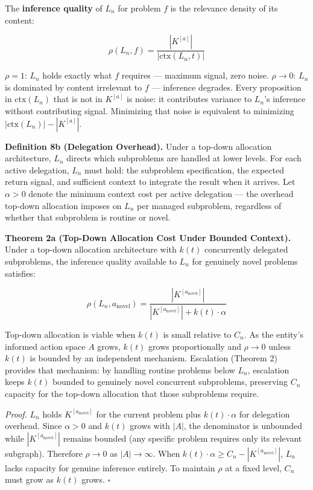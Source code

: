 \documentclass[
]{article}
\begin{document}
The \textbf{inference quality} of \(L_n\) for problem \(f\) is the
relevance density of its content:

\[\rho(L_n, f) = \frac{|K^{[a]}|}{|\text{ctx}(L_n, t)|}\]

\(\rho = 1\): \(L_n\) holds exactly what \(f\) requires --- maximum
signal, zero noise. \(\rho \to 0\): \(L_n\) is dominated by content
irrelevant to \(f\) --- inference degrades. Every proposition in
\(\text{ctx}(L_n)\) that is not in \(K^{[a]}\) is noise: it contributes
variance to \(L_n\)'s inference without contributing signal. Minimizing
that noise is equivalent to minimizing
\(|\text{ctx}(L_n)| - |K^{[a]}|\).

\textbf{Definition 8b (Delegation Overhead).} Under a top-down
allocation architecture, \(L_n\) directs which subproblems are handled
at lower levels. For each active delegation, \(L_n\) must hold: the
subproblem specification, the expected return signal, and sufficient
context to integrate the result when it arrives. Let \(\alpha > 0\)
denote the minimum context cost per active delegation --- the overhead
top-down allocation imposes on \(L_n\) per managed subproblem,
regardless of whether that subproblem is routine or novel.

\textbf{Theorem 2a (Top-Down Allocation Cost Under Bounded Context).}
Under a top-down allocation architecture with \(k(t)\) concurrently
delegated subproblems, the inference quality available to \(L_n\) for
genuinely novel problems satisfies:

\[\rho(L_n, a_{\text{novel}}) = \frac{|K^{[a_{\text{novel}}]}|}{|K^{[a_{\text{novel}}]}| + k(t)\cdot\alpha}\]

Top-down allocation is viable when \(k(t)\) is small relative to
\(C_n\). As the entity's informed action space \(A\) grows, \(k(t)\)
grows proportionally and \(\rho \to 0\) unless \(k(t)\) is bounded by
an independent mechanism. Escalation (Theorem 2) provides that
mechanism: by handling routine problems below \(L_n\), escalation keeps
\(k(t)\) bounded to genuinely novel concurrent subproblems, preserving
\(C_n\) capacity for the top-down allocation that those subproblems
require.

\emph{Proof.} \(L_n\) holds \(K^{[a_{\text{novel}}]}\) for the current
problem plus \(k(t)\cdot\alpha\) for delegation overhead. Since
\(\alpha > 0\) and \(k(t)\) grows with \(|A|\), the denominator is
unbounded while \(|K^{[a_{\text{novel}}]}|\) remains bounded (any
specific problem requires only its relevant subgraph). Therefore
\(\rho \to 0\) as \(|A| \to \infty\). When
\(k(t)\cdot\alpha \geq C_n - |K^{[a_{\text{novel}}]}|\), \(L_n\) lacks
capacity for genuine inference entirely. To maintain \(\rho\) at a fixed
level, \(C_n\) must grow as \(k(t)\) grows. \(\square\)
\end{document}
